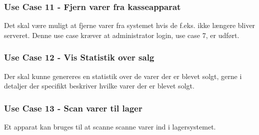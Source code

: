 \subsubsection*{Use Case 11 - Fjern varer fra kasseapparat}
Det skal være muligt at fjerne varer fra systemet hvis de f.eks. ikke længere bliver serveret. Denne use case kræver at administrator login, use case 7, er udført.

\subsubsection*{Use Case 12 - Vis Statistik over salg}
Der skal kunne genereres en statistik over de varer der er blevet solgt, gerne i detaljer der specifikt beskriver hvilke varer der er blevet solgt.

\subsubsection*{Use Case 13 - Scan varer til lager}
Et apparat kan bruges til at scanne scanne varer ind i lagersystemet. 